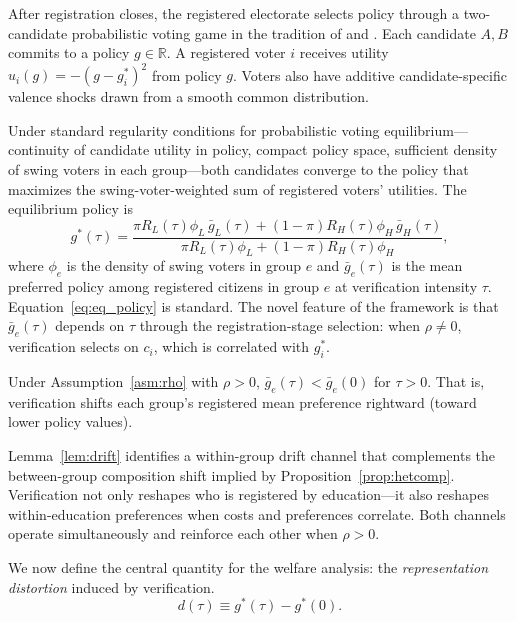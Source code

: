 After registration closes, the registered electorate selects policy through a two-candidate probabilistic voting game in the tradition of \citet{Lindbeck1987BalancedBudgetRedistri} and \citet{Dixit1996TheDeterminSuccess}. Each candidate $A, B$ commits to a policy $g \in \mathbb{R}$. A registered voter $i$ receives utility $u_i(g) = -(g - g_i^*)^2$ from policy $g$. Voters also have additive candidate-specific valence shocks drawn from a smooth common distribution.

Under standard regularity conditions for probabilistic voting equilibrium---continuity of candidate utility in policy, compact policy space, sufficient density of swing voters in each group---both candidates converge to the policy that maximizes the swing-voter-weighted sum of registered voters' utilities. The equilibrium policy is
\begin{equation}
g^*(\tau) = \frac{\pi R_L(\tau) \phi_L \, \bar g_L(\tau) + (1-\pi) R_H(\tau) \phi_H \, \bar g_H(\tau)}{\pi R_L(\tau) \phi_L + (1-\pi) R_H(\tau) \phi_H},
\label{eq:eq_policy}
\end{equation}
where $\phi_e$ is the density of swing voters in group $e$ and $\bar g_e(\tau)$ is the mean preferred policy among registered citizens in group $e$ at verification intensity $\tau$. Equation~\eqref{eq:eq_policy} is standard. The novel feature of the framework is that $\bar g_e(\tau)$ depends on $\tau$ through the registration-stage selection: when $\rho \neq 0$, verification selects on $c_i$, which is correlated with $g_i^*$.

\begin{lemma}
\label{lem:drift}
Under Assumption~\ref{asm:rho} with $\rho > 0$, $\bar g_e(\tau) < \bar g_e(0)$ for $\tau > 0$. That is, verification shifts each group's registered mean preference rightward (toward lower policy values).
\end{lemma}

Lemma~\ref{lem:drift} identifies a within-group drift channel that complements the between-group composition shift implied by Proposition~\ref{prop:hetcomp}. Verification not only reshapes who is registered by education---it also reshapes within-education preferences when costs and preferences correlate. Both channels operate simultaneously and reinforce each other when $\rho > 0$.

We now define the central quantity for the welfare analysis: the \emph{representation distortion} induced by verification.
\begin{equation}
d(\tau) \equiv g^*(\tau) - g^*(0).
\label{eq:representation_distortion}
\end{equation}

